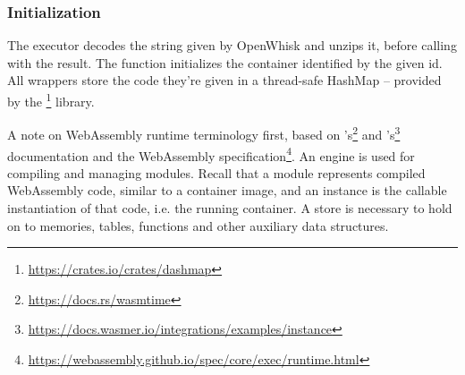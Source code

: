 \subsubsection{Initialization}
The executor decodes the  string given by OpenWhisk and unzips it, before calling  with the result. The function initializes the container identified by the given id. All wrappers store the code they're given in a thread-safe HashMap -- provided by the \footnote{\url{https://crates.io/crates/dashmap}} library.

A note on WebAssembly runtime terminology first, based on 's\footnote{\url{https://docs.rs/wasmtime}} and 's\footnote{\url{https://docs.wasmer.io/integrations/examples/instance}} documentation and the WebAssembly specification\footnote{\url{https://webassembly.github.io/spec/core/exec/runtime.html}}. An engine is used for compiling and managing modules. Recall that a module represents compiled WebAssembly code, similar to a container image, and an instance is the callable instantiation of that code, i.e. the running container. A store is necessary to hold on to memories, tables, functions and other auxiliary data structures.


